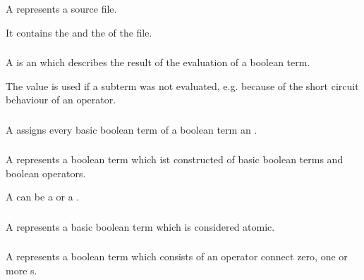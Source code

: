 \subsubsection[SourceFile]{}

A  represents a source file.

It contains the  and the  of the file.

\subsubsection[BooleanResult]{}

A  is an  which describes the result of the
evaluation of a boolean term.

The value  is used if a subterm was not evaluated, e.g.
because of the short circuit behaviour of an operator.

\subsubsection[BooleanAssignment]{}

A  assigns every basic boolean term of a boolean term
an .

\subsubsection[BooleanTerm]{}

A  represents a boolean term which ist constructed of basic
boolean terms and boolean operators.

A  can be a  or a .

\subsubsection[BasicBooleanTerm]{}

A  represents a basic boolean term which is considered
atomic.

\subsubsection[OperatorTerm]{}

A  represents a boolean term which consists of an operator
connect zero, one or more s.

